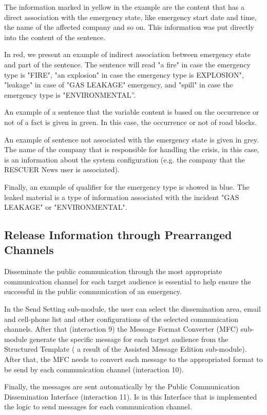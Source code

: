 The information marked in yellow in the example are the content that has a direct association with the emergency state, like emergency start date and time, the name of the affected company and so on. This information was put directly into the content of the sentence.

In red, we present an example of indirect association between emergency state and part of the sentence. The sentence will read "a fire" in case the emergency type is "FIRE", "an explosion" in case the emergency type is EXPLOSION", "leakage" in case of "GAS LEAKAGE" emergency, and "spill" in case the emergency type is "ENVIRONMENTAL”. 

An example of a sentence that the variable content is based on the occurrence or not of a fact is given in green. In this case, the occurrence or not of road blocks. 

An example of sentence not associated with the emergency state is given in grey. The name of the company that is responsible for handling the crisis, in this case, is an information about the system configuration (e.g. the company that the RESCUER News user is associated).

Finally, an example of qualifier for the emergency type is showed in blue. The leaked material is a type of information associated with the incident "GAS LEAKAGE" or "ENVIRONMENTAL".



\subsection{Release Information through Prearranged Channels}

Disseminate the public communication through the most appropriate communication channel for each target audience is essential to help ensure the successful in the public communication of an emergency.

In the Send Setting sub-module, the user can select the dissemination area, email and cell-phone list and other configurations of the selected communication channels. After that (interaction 9) the Message Format Converter (MFC) sub-module generate the specific message for each target audience from the Structured Template ( a result of the Assisted Message Edition sub-module).  After that, the MFC needs to convert each message to the appropriated format to be send by each communication channel (interaction 10). 

Finally, the messages are sent automatically by the Public Communication Dissemination Interface (interaction 11). Is in this Interface that is implemented the logic to send messages for each communication channel. 







